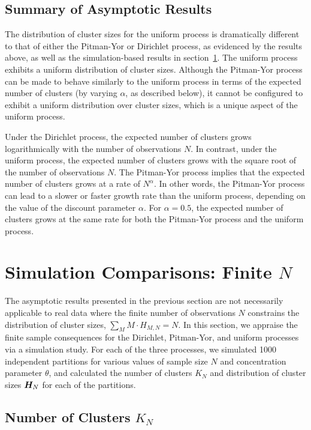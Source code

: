 \documentclass[twoside]{article}
\begin{document}
\subsection{Summary of Asymptotic Results}

The distribution of cluster sizes for the uniform process is
dramatically different to that of either the Pitman-Yor or Dirichlet
process, as evidenced by the results above, as well as the
simulation-based results in section~\ref{simulationstudy}. The uniform
process exhibits a uniform distribution of cluster sizes. Although the
Pitman-Yor process can be made to behave similarly to the uniform
process in terms of the expected number of clusters (by varying
$\alpha$, as described below), it cannot be configured to exhibit a
uniform distribution over cluster sizes, which is a unique aspect of
the uniform process.

Under the Dirichlet process, the expected number of clusters grows
logarithmically with the number of observations $N$. In contrast,
under the uniform process, the expected number of clusters grows with
the square root of the number of observations $N$. The Pitman-Yor
process implies that the expected number of clusters grows at a rate
of $N^\alpha$. In other words, the Pitman-Yor process can lead to a
slower or faster growth rate than the uniform process, depending on
the value of the discount parameter $\alpha$. For $\alpha = 0.5$, the
expected number of clusters grows at the same rate for both the
Pitman-Yor process and the uniform process.

\section{Simulation Comparisons: Finite $N$}
\label{simulationstudy}

The asymptotic results presented in the previous section are not
necessarily applicable to real data where the finite number of
observations $N$ constrains the distribution of cluster sizes,
$\sum_{M} M \cdot H_{M,N} = N$.  In this section, we appraise the
finite sample consequences for the Dirichlet, Pitman-Yor, and uniform
processes via a simulation study. For each of the three processes, we
simulated 1000 independent partitions for various values of sample
size $N$ and concentration parameter $\theta$, and calculated the
number of clusters $K_N$ and distribution of cluster sizes $\boldsymbol{H}_N$ for
each of the partitions.

\subsection{Number of Clusters $K_N$}
\end{document}
